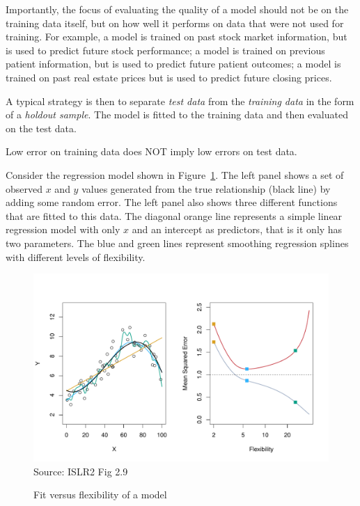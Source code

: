 Importantly, the focus of evaluating the quality of a model should not be on the training data itself, but on how well it performs on data that were not used for training. For example, a model is trained on past stock market information, but is used to predict future stock performance; a model is trained on previous patient information, but is used to predict future patient outcomes; a model is trained on past real estate prices but is used to predict future closing prices. 

A typical strategy is then to separate \emph{test data} from the \emph{training data} in the form of a \emph{holdout sample}. The model is fitted to the training data and then evaluated on the test data.

\begin{tcolorbox}[colback=LavenderBlush2]
Low error on training data does NOT imply low errors on test data.
\end{tcolorbox}

Consider the regression model shown in Figure~\ref{fig:freedom}. The left panel shows a set of observed $x$ and $y$ values generated from the true relationship (black line) by adding some random error. The left panel also shows three different functions that are fitted to this data. The diagonal orange line represents a simple linear regression model with only $x$ and an intercept as predictors, that is it only has two parameters. The blue and green lines represent smoothing regression splines with different levels of flexibility.

\begin{figure}[b]
\centering
\includegraphics[width=.9\textwidth]{Figures_Chapters_1-6/Chapter2/2_9.pdf} \\

\scriptsize Source: ISLR2 Fig 2.9
\caption{Fit versus flexibility of a model}
\label{fig:freedom}
\end{figure}

